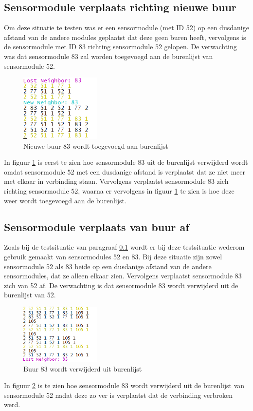 \documentclass[a4paper, 11pt]{article}
\begin{document}
\subsection{Sensormodule verplaats richting nieuwe buur} \label{VerplaatsNaar}
Om deze situatie te testen was er een sensormodule (met ID 52) op een dusdanige afstand van de andere modules geplaatst dat deze geen buren heeft, vervolgens is de sensormodule met ID 83 richting sensormodule 52 gelopen. De verwachting was dat sensormodule 83 zal worden toegevoegd aan de burenlijst van sensormodule 52.
\begin{figure}[h!]
	\centering
	\includegraphics[width=4cm]{TestResults/LooptNaarNode/LoopNaarNieuweBuur_52_83.PNG}
	\caption{Nieuwe buur 83 wordt toegevoegd aan burenlijst} \label{LoopNaarNode}
\end{figure}
In figuur \ref{LoopNaarNode} is eerst te zien hoe sensormodule 83 uit de burenlijst verwijderd wordt omdat sensormodule 52 met een dusdanige afstand is verplaatst dat ze niet meer met elkaar in verbinding staan. Vervolgens verplaatst sensormodule 83 zich richting sensormodule 52, waarna er vervolgens in figuur \ref{LoopNaarNode} te zien is hoe deze weer wordt toegevoegd aan de burenlijst.

\subsection{Sensormodule verplaats van buur af}
Zoals bij de testsituatie van paragraaf \ref{VerplaatsNaar} wordt er bij deze testsituatie wederom gebruik gemaakt van sensormodules 52 en 83. Bij deze situatie zijn zowel sensormodule 52 als 83 beide op een dusdanige afstand van de andere sensormodules, dat ze alleen elkaar zien. Vervolgens verplaatst sensormodule 83 zich van 52 af. De verwachting is dat sensormodule 83 wordt verwijderd uit de burenlijst van 52.
\newpage

\begin{figure}[h!]
	\centering
	\includegraphics[width=4cm]{TestResults/LooptWegVanNode/LoopWegBijBuur_52_83.PNG}
	\caption{Buur 83 wordt verwijderd uit burenlijst} \label{LoopWegVanNode}
\end{figure}
In figuur \ref{LoopWegVanNode} is te zien hoe sensormodule 83 wordt verwijderd uit de burenlijst van sensormodule 52 nadat deze zo ver is verplaatst dat de verbinding verbroken werd.
\end{document}
